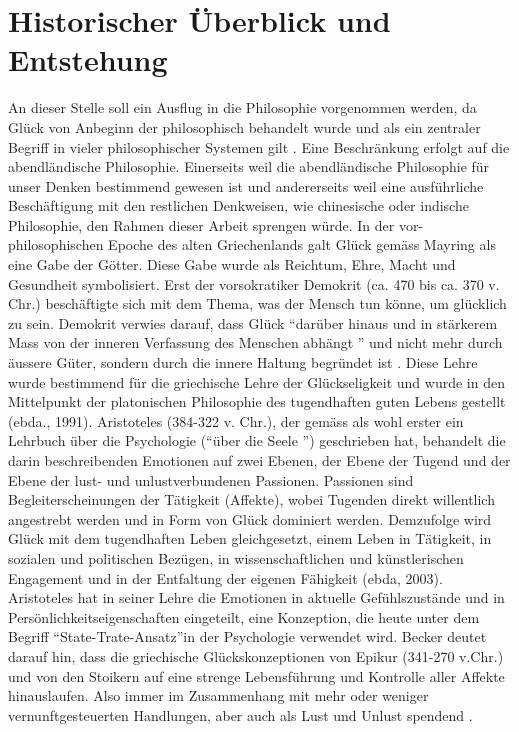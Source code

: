 \section{Historischer Überblick und Entstehung}\label{überblick}
An dieser Stelle soll ein Ausflug in die Philosophie vorgenommen werden, da Glück von Anbeginn der philosophisch behandelt wurde und als ein zentraler Begriff in vieler philosophischer Systemen gilt \cite{Mayring:1991}. Eine Beschränkung erfolgt auf die abendländische Philosophie. Einerseits weil die abendländische Philosophie für unser Denken bestimmend gewesen ist und andererseits weil eine ausführliche Beschäftigung mit den restlichen Denkweisen, wie chinesische oder indische Philosophie, den Rahmen dieser Arbeit sprengen würde. \newline
In der vor-philosophischen Epoche des alten Griechenlands galt Glück gemäss Mayring \cite{Mayring:1991} als eine Gabe der Götter. Diese Gabe wurde als Reichtum, Ehre, Macht und Gesundheit symbolisiert. Erst der vorsokratiker Demokrit (ca. 470 bis ca. 370 v. Chr.) beschäftigte sich mit dem Thema, was der Mensch tun könne, um glücklich zu sein. Demokrit verwies darauf, dass Glück \textquotedblleft darüber hinaus und in stärkerem Mass von der inneren Verfassung des Menschen abhängt \textquotedblright \cite{Becker:1994} und nicht mehr durch äussere Güter, sondern durch die innere Haltung begründet ist \cite{Mayring:1991}. Diese Lehre wurde bestimmend für die griechische Lehre der Glückseligkeit und wurde in den Mittelpunkt der platonischen Philosophie des tugendhaften guten Lebens gestellt (ebda., 1991).\newline
Aristoteles (384-322 v. Chr.), der gemäss \cite{Mayring:2003} als wohl erster ein Lehrbuch über die Psychologie (\textquotedblleft über die Seele \textquotedblright) geschrieben hat, behandelt die darin beschreibenden Emotionen auf zwei Ebenen, der Ebene der Tugend und der Ebene der lust- und unlustverbundenen Passionen. Passionen sind Begleiterscheinungen der Tätigkeit (Affekte), wobei Tugenden direkt willentlich angestrebt werden und in Form von Glück dominiert werden. Demzufolge wird Glück mit dem tugendhaften Leben gleichgesetzt, einem Leben in Tätigkeit, in sozialen und politischen Bezügen, in wissenschaftlichen und künstlerischen Engagement und in der Entfaltung der eigenen Fähigkeit (ebda, 2003). Aristoteles hat in seiner Lehre die Emotionen in aktuelle Gefühlszustände und in Persönlichkeitseigenschaften eingeteilt, eine Konzeption, die heute unter dem Begriff \textquotedblleft State-Trate-Ansatz\textquotedblright in der Psychologie verwendet wird. Becker \cite{Becker:1994} deutet darauf hin, dass die griechische Glückskonzeptionen von Epikur (341-270 v.Chr.) und von den Stoikern auf eine strenge Lebensführung und Kontrolle aller Affekte hinauslaufen. Also immer im Zusammenhang mit mehr oder weniger vernunftgesteuerten Handlungen, aber auch als Lust und Unlust spendend \cite{Mayring:2003}.\newline
